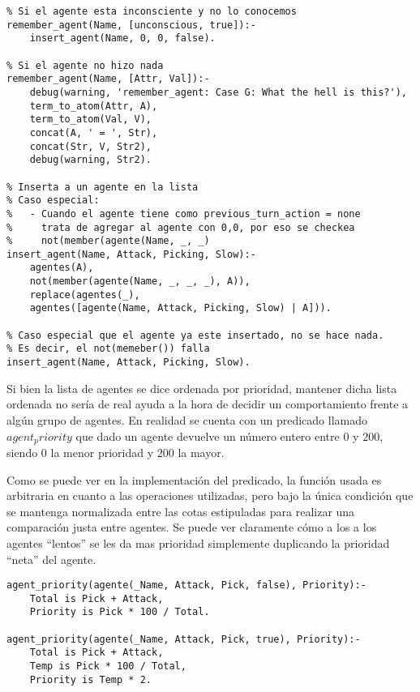 \documentclass[a4paper,10pt,spanish]{article}
\begin{document}
\begin{lstlisting}
% Si el agente esta inconsciente y no lo conocemos
remember_agent(Name, [unconscious, true]):-
	insert_agent(Name, 0, 0, false).
	
% Si el agente no hizo nada
remember_agent(Name, [Attr, Val]):- 
	debug(warning, 'remember_agent: Case G: What the hell is this?'),
	term_to_atom(Attr, A),
	term_to_atom(Val, V),
	concat(A, ' = ', Str),
	concat(Str, V, Str2),
	debug(warning, Str2).

% Inserta a un agente en la lista
% Caso especial: 
%	- Cuando el agente tiene como previous_turn_action = none 
%     trata de agregar al agente con 0,0, por eso se checkea 
%     not(member(agente(Name, _, _)
insert_agent(Name, Attack, Picking, Slow):- 
	agentes(A), 
	not(member(agente(Name, _, _, _), A)), 
	replace(agentes(_), 
	agentes([agente(Name, Attack, Picking, Slow) | A])).

% Caso especial que el agente ya este insertado, no se hace nada.
% Es decir, el not(memeber()) falla
insert_agent(Name, Attack, Picking, Slow).
	\end{lstlisting}
	
	Si bien la lista de agentes se dice ordenada por prioridad, mantener dicha lista ordenada no ser\'ia de real ayuda a la hora de decidir un comportamiento frente a alg\'un grupo de agentes. En realidad se cuenta con un predicado llamado $agent_priority$ que dado un agente devuelve un n\'umero entero entre $0$ y $200$, siendo $0$ la menor prioridad y $200$ la mayor.
	
	Como se puede ver en la implementaci\'on del predicado, la funci\'on usada es arbitraria en cuanto a las operaciones utilizadas, pero bajo la \'unica condici\'on que se mantenga normalizada entre las cotas estipuladas para realizar una comparaci\'on justa entre agentes. Se puede ver claramente c\'omo a los a los agentes ``lentos'' se les da mas prioridad simplemente duplicando la prioridad ``neta'' del agente.
	
	\begin{lstlisting}
agent_priority(agente(_Name, Attack, Pick, false), Priority):-
	Total is Pick + Attack,
	Priority is Pick * 100 / Total.

agent_priority(agente(_Name, Attack, Pick, true), Priority):-
	Total is Pick + Attack,
	Temp is Pick * 100 / Total,
	Priority is Temp * 2.
	\end{lstlisting}

	
\end{document}
